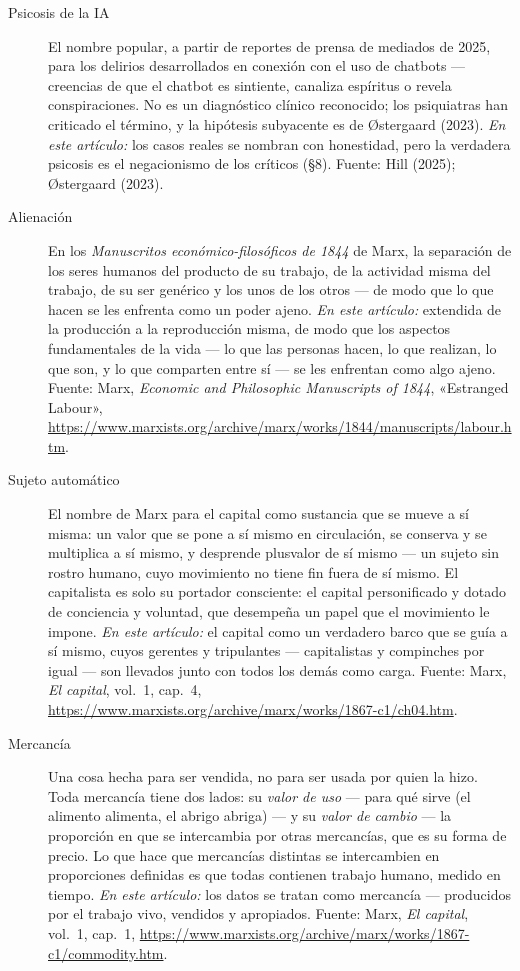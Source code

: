 \documentclass[11pt]{article}
\begin{document}
\begin{description}
\item[Psicosis de la IA] El nombre popular, a partir de reportes de
prensa de mediados de 2025, para los delirios desarrollados en conexión
con el uso de chatbots --- creencias de que el chatbot es sintiente,
canaliza espíritus o revela conspiraciones. No es un diagnóstico clínico
reconocido; los psiquiatras han criticado el término, y la hipótesis
subyacente es de Østergaard (2023). \emph{En este artículo:} los casos
reales se nombran con honestidad, pero la verdadera psicosis es el
negacionismo de los críticos (§8). Fuente: Hill (2025); Østergaard
(2023).

\item[Alienación] En los \textit{Manuscritos económico-filosóficos de
1844} de Marx, la separación de los seres humanos del producto de su
trabajo, de la actividad misma del trabajo, de su ser genérico y los
unos de los otros --- de modo que lo que hacen se les enfrenta como un
poder ajeno. \emph{En este artículo:} extendida de la producción a la
reproducción misma, de modo que los aspectos fundamentales de la vida
--- lo que las personas hacen, lo que realizan, lo que son, y lo que
comparten entre sí --- se les enfrentan como algo ajeno. Fuente: Marx,
\textit{Economic and Philosophic Manuscripts of 1844}, «Estranged
Labour»,
\url{https://www.marxists.org/archive/marx/works/1844/manuscripts/labour.htm}.

\item[Sujeto automático] El nombre de Marx para el capital como
sustancia que se mueve a sí misma: un valor que se pone a sí mismo en
circulación, se conserva y se multiplica a sí mismo, y desprende
plusvalor de sí mismo --- un sujeto sin rostro humano, cuyo movimiento
no tiene fin fuera de sí mismo. El capitalista es solo su portador
consciente: el capital personificado y dotado de conciencia y voluntad,
que desempeña un papel que el movimiento le impone. \emph{En este
artículo:} el capital como un verdadero barco que se guía a sí mismo,
cuyos gerentes y tripulantes --- capitalistas y compinches por igual ---
son llevados junto con todos los demás como carga. Fuente: Marx,
\textit{El capital}, vol.~1, cap.~4,
\url{https://www.marxists.org/archive/marx/works/1867-c1/ch04.htm}.

\item[Mercancía] Una cosa hecha para ser vendida, no para ser usada por
quien la hizo. Toda mercancía tiene dos lados: su \emph{valor de uso}
--- para qué sirve (el alimento alimenta, el abrigo abriga) --- y su
\emph{valor de cambio} --- la proporción en que se intercambia por
otras mercancías, que es su forma de precio. Lo que hace que
mercancías distintas se intercambien en proporciones definidas es que
todas contienen trabajo humano, medido en tiempo. \emph{En este
artículo:} los datos se tratan como mercancía --- producidos por el
trabajo vivo, vendidos y apropiados. Fuente: Marx, \emph{El capital},
vol.~1, cap.~1,
\url{https://www.marxists.org/archive/marx/works/1867-c1/commodity.htm}.


\end{description}
\end{document}
